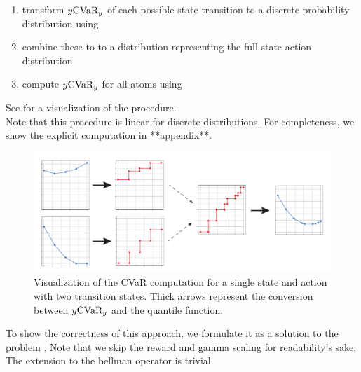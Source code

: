 
\begin{enumerate}
\item transform $y \text{CVaR}_y$ of each possible state transition to a discrete probability distribution using 
\item combine these to to a distribution representing the full state-action distribution
\item compute $y \text{CVaR}_y$ for all atoms using 
\end{enumerate}
See  for a visualization of the procedure. 
\\
Note that this procedure is linear for discrete distributions. For completeness, we show the explicit computation in **appendix**. 

\begin{figure}
\center
\includegraphics[width=\linewidth]{gfx/cvar_vi_conversion.pdf}
\caption{Visualization of the CVaR computation for a single state and action with two transition states. Thick arrows represent the conversion between $y\text{CVaR}_y$ and the quantile function.}
\label{fig:cvarcomputation}
\end{figure}


To show the correctness of this approach, we formulate it as a solution to the problem . Note that we skip the reward and gamma scaling for readability's sake. The extension to the bellman operator is trivial.

